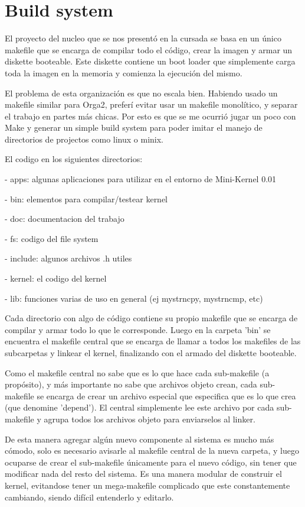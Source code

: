 \section{Build system}

El proyecto del nucleo que se nos presentó en la cursada se basa en un único
makefile que se encarga de compilar todo el código, crear la imagen y armar
un diskette booteable.
Este diskette contiene un boot loader que simplemente carga toda la imagen en
la memoria y comienza la ejecución del mismo.

El problema de esta organización es que no escala bien. Habiendo usado un
makefile similar para Orga2, preferí evitar usar un makefile monolítico, y
separar el trabajo en partes más chicas.
Por esto es que se me ocurrió jugar un poco con Make y generar un simple build
system para poder imitar el manejo de directorios de projectos como linux o
minix.

El codigo en los siguientes directorios:

- apps: algunas aplicaciones para utilizar en el entorno de Mini-Kernel 0.01

- bin: elementos para compilar/testear kernel

- doc: documentacion del trabajo

- fs: codigo del file system

- include: algunos archivos .h utiles

- kernel: el codigo del kernel

- lib: funciones varias de uso en general (ej mystrncpy, mystrncmp, etc)

Cada directorio con algo de código contiene su propio makefile que se
encarga de compilar y armar todo lo que le corresponde. Luego en la carpeta
'bin' se encuentra el makefile central que se encarga de llamar a todos los
makefiles de las subcarpetas y linkear el kernel, finalizando con el armado del
diskette booteable.

Como el makefile central no sabe que es lo que hace cada sub-makefile (a
propósito), y más importante no sabe que archivos objeto crean, cada
sub-makefile se encarga de crear un archivo especial que especifica que es lo
que crea (que denomine 'depend'). El central simplemente lee este archivo por
cada sub-makefile y agrupa todos los archivos objeto para enviarselos al linker.

De esta manera agregar algún nuevo componente al sistema es mucho más cómodo,
solo es necesario avisarle al makefile central de la nueva carpeta, y luego
ocuparse de crear el sub-makefile únicamente para el nuevo código, sin tener que
modificar nada del resto del sistema. Es una manera modular de construir el
kernel, evitandose tener un mega-makefile complicado que este constantemente
cambiando, siendo difícil entenderlo y editarlo.

